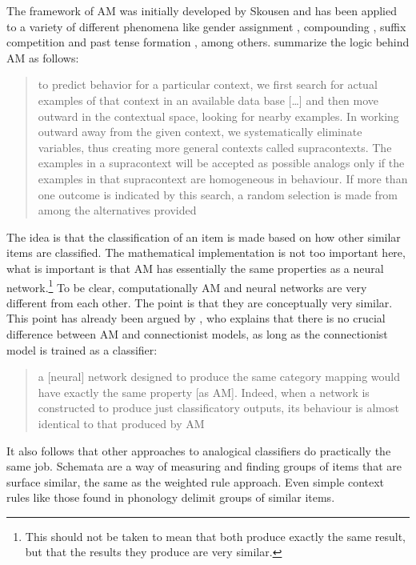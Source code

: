 The framework of AM was initially developed by Skousen \autocites{Skousen.1989, Skousen.2002, Skousen.2013} and has been applied to a variety of different phenomena like gender assignment \autocites{Eddington.2002, Eddington.2004}, compounding \autocite{Arndt-Lappe.2011}, suffix competition \autocite{Arndt-Lappe.2014} and past tense formation \autocite{Derwing.1994}, among others. \textcite[193]{Derwing.1994} summarize the logic behind AM as follows:

\begin{quotation}
to predict behavior for a particular context, we first search for actual examples of that context in an available data base [\dots] and then move outward in the contextual space, looking for nearby examples. In working outward away from the given context, we systematically eliminate variables, thus creating more general contexts called supracontexts. The examples in a supracontext will be accepted as possible analogs only if the examples in that supracontext are homogeneous in behaviour. If more than one outcome is indicated by this search, a random selection is made from among the alternatives provided
\autocite[193]{Derwing.1994}
\end{quotation}

\largerpage
The idea is that the classification of an item is made based on how other similar items are classified. The mathematical implementation is not too important here, what is important is that AM has essentially the same properties as a neural network.\footnote{This should not be taken to mean that both produce exactly the same result, but that the results they produce are very similar.} To be clear, computationally AM and neural networks are very different from each other. The point is that they are conceptually very similar. This point has already been argued by \textcite[289]{Matthews.2005}, who explains that there is no crucial difference between AM and connectionist models, as long as the connectionist model is trained as a classifier:

\begin{quotation}
a [neural] network designed to produce the same category mapping would have exactly the same property [as AM]. Indeed, when a network is constructed to produce just classificatory outputs, its behaviour is almost identical to that produced by AM
\autocite[289]{Matthews.2005}
\end{quotation}

It also follows that other approaches to analogical classifiers do practically the same job. Schemata are a way of measuring and finding groups of items that are surface similar, the same as the weighted rule approach. Even simple context rules like those found in phonology delimit groups of similar items.

